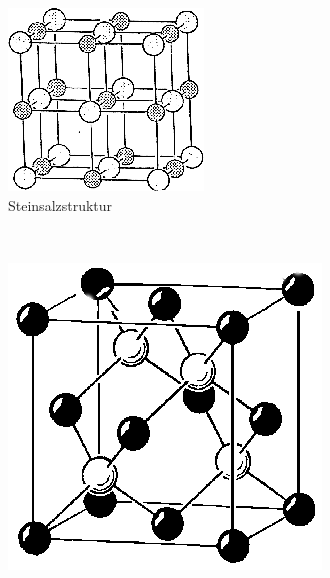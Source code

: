 \begin{figure}[htbp]
	\centering
	\begin{subfigure}[b]{0.3\textwidth}
		\includegraphics[width=\textwidth]{../pics/steinsalz.png}
		\caption{Steinsalzstruktur}
		\label{pic:steinsalz}
	\end{subfigure}
	~ %
	\begin{subfigure}[b]{0.3\textwidth}
		\includegraphics[width=\textwidth]{../pics/zinkblende.png}

\end{subfigure}
\end{figure}
